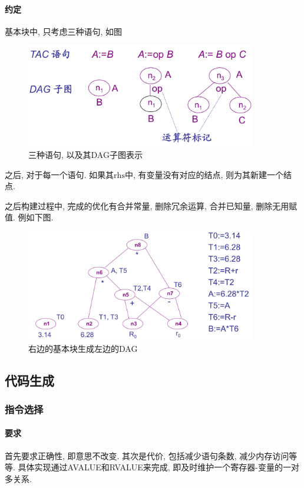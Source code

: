 \documentclass{ctexart}
\begin{document}
\paragraph{约定} 基本块中, 只考虑三种语句, 如图
    \begin{figure}[ht]
    \centering
    \includegraphics[width=0.9\textwidth]{bb-dag.png}
    \caption{三种语句, 以及其DAG子图表示}
    \label{bb-dag}
    \end{figure}
    之后, 对于每一个语句. 如果其$\mathrm{rhs}$中, 
    有变量没有对应的结点, 则为其新建一个结点.\par
    之后构建过程中, 完成的优化有合并常量,
    删除冗余运算, 合并已知量, 删除无用赋值.
    例如下图.
    \begin{figure}[ht]
    \centering
    \includegraphics[width=0.9\textwidth]{bb-dag-ex.png}
    \caption{右边的基本块生成左边的DAG}
    \label{bb-dag-ex}
    \end{figure}

\subsection{代码生成}
\subsubsection{指令选择}
\paragraph{要求} 首先要求正确性, 即意思不改变.
    其次是代价, 包括减少语句条数, 减少内存访问等等.
    具体实现通过AVALUE和RVALUE来完成, 即及时维护一个寄存器-变量的一对多关系.
\end{document}
